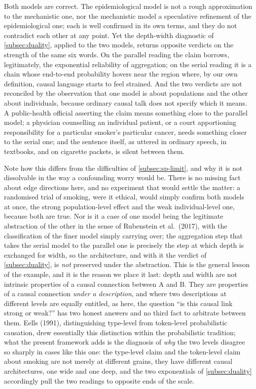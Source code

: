 \documentclass[11pt]{article}
\theoremstyle{definition}
\begin{document}
Both models are correct. The epidemiological model is not a rough approximation to the mechanistic one, nor the mechanistic model a speculative refinement of the epidemiological one; each is well confirmed in its own terms, and they do not contradict each other at any point. Yet the depth-width diagnostic of \cref{subsec:duality}, applied to the two models, returns opposite verdicts on the strength of the same six words. On the parallel reading the claim borrows, legitimately, the exponential reliability of aggregation; on the serial reading it is a chain whose end-to-end probability hovers near the region where, by our own definition, causal language starts to feel strained. And the two verdicts are not reconciled by the observation that one model is about populations and the other about individuals, because ordinary causal talk does not specify which it means. A public-health official asserting the claim means something close to the parallel model; a physician counselling an individual patient, or a court apportioning responsibility for a particular smoker's particular cancer, needs something closer to the serial one; and the sentence itself, as uttered in ordinary speech, in textbooks, and on cigarette packets, is silent between them.

Note how this differs from the difficulties of \cref{subsec:sp-limit}, and why it is not dissolvable in the way a confounding worry would be. There is no missing fact about edge directions here, and no experiment that would settle the matter: a randomised trial of smoking, were it ethical, would simply confirm both models at once, the strong population-level effect and the weak individual-level one, because both are true. Nor is it a case of one model being the legitimate abstraction of the other in the sense of Rubenstein et al.\ (2017), with the classification of the finer model simply carrying over; the aggregation step that takes the serial model to the parallel one is precisely the step at which depth is exchanged for width, so the architecture, and with it the verdict of \cref{subsec:duality}, is \emph{not} preserved under the abstraction. This is the general lesson of the example, and it is the reason we place it last: depth and width are not intrinsic properties of a causal connection between A and B. They are properties of a causal connection \emph{under a description}, and where two descriptions at different levels are equally entitled, as here, the question ``is this causal link strong or weak?'' has two honest answers and no third fact to arbitrate between them. Eells (1991), distinguishing type-level from token-level probabilistic causation, drew essentially this distinction within the probabilistic tradition; what the present framework adds is the diagnosis of \emph{why} the two levels disagree so sharply in cases like this one: the type-level claim and the token-level claim about smoking are not merely at different grains, they have different causal architectures, one wide and one deep, and the two exponentials of \cref{subsec:duality} accordingly pull the two readings to opposite ends of the scale.
\end{document}
